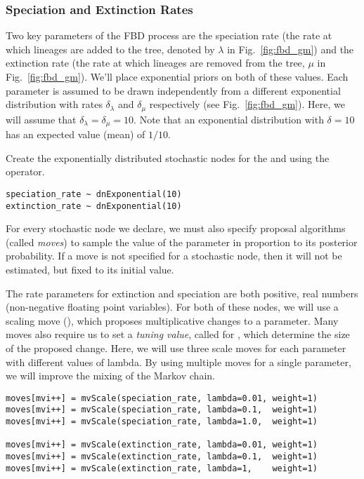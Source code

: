 \subsubsection{Speciation and Extinction Rates}\label{subsub:Exercise-FBD-SpeciationExtinction}

Two key parameters of the FBD process are the speciation rate (the rate at which lineages are added to the tree, denoted by $\lambda$ in Fig.\ \ref{fig:fbd_gm}) and the extinction rate (the rate at which lineages are removed from the tree, $\mu$ in Fig.\ \ref{fig:fbd_gm}). 
We'll place exponential priors on both of these values. 
Each parameter is assumed to be drawn independently from a different exponential distribution with rates $\delta_{\lambda}$ and $\delta_{\mu}$ respectively (see Fig.\ \ref{fig:fbd_gm}). 
Here, we will assume that $\delta_{\lambda} = \delta_{\mu} = 10$. 
Note that an exponential distribution with $\delta = 10$ has an expected value (mean) of $1/10$. 

Create the exponentially distributed stochastic nodes for the  and  using the \cl{\textasciitilde} operator.
{\tt \begin{snugshade*}
\begin{lstlisting}
speciation_rate ~ dnExponential(10)
extinction_rate ~ dnExponential(10)
\end{lstlisting}
\end{snugshade*}}

For every stochastic node we declare, we must also specify proposal algorithms (called \textit{moves}) to sample the value of the parameter in proportion to its posterior probability.
If a move is not specified for a stochastic node, then it will not be estimated, but fixed to its initial value. 

The rate parameters for extinction and speciation are both positive, real numbers (\IE non-negative floating point variables). 
For both of these nodes, we will use a scaling move (), which proposes multiplicative changes to a parameter.
Many moves also require us to set a \textit{tuning value}, called  for , which determine the size of the proposed change. 
Here, we will use three scale moves for each parameter with  different values of lambda. 
By using multiple moves for a single parameter, we will improve the mixing of the Markov chain. 
{\tt \begin{snugshade*}
\begin{lstlisting}
moves[mvi++] = mvScale(speciation_rate, lambda=0.01, weight=1)
moves[mvi++] = mvScale(speciation_rate, lambda=0.1,  weight=1)
moves[mvi++] = mvScale(speciation_rate, lambda=1.0,  weight=1)

moves[mvi++] = mvScale(extinction_rate, lambda=0.01, weight=1)
moves[mvi++] = mvScale(extinction_rate, lambda=0.1,  weight=1)
moves[mvi++] = mvScale(extinction_rate, lambda=1,    weight=1)
\end{lstlisting}
\end{snugshade*}}

